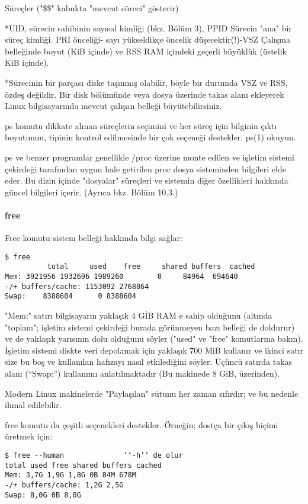 \begin{section}{Süreçler}
("\$\$" kabukta "mevcut süreci" gösterir)

*UID, sürecin sahibinin sayısal kimliği (bkz. Bölüm 3), PPID Sürecin "ana" bir süreç kimliği. PRI önceliği- sayı yükseldikçe öncelik düşecektir(!)-VSZ Çalışma 
belleğinde boyut (KiB içinde) ve RSS RAM içindeki geçerli büyüklük (üstelik KiB içinde).

*Sürecinin bir parçası diske taşınmış olabilir, böyle bir durumda VSZ ve RSS, özdeş değildir. Bir disk bölümünde veya dosya üzerinde takas alanı ekleyerek 
Linux bilgisayarında mevcut çalışan belleği büyütebilirsiniz. 

ps komutu dikkate alınan süreçlerin seçimini ve her süreç için bilginin çıktı boyutunun, tipinin kontrol edilmesinde bir çok seçeneği destekler. ps(1) okuyun.

ps ve benzer programlar genellikle /proc üzerine monte edilen ve işletim sistemi çekirdeği tarafından uygun hale getirilen proc dosya sisteminden bilgileri elde eder. Bu dizin içinde "dosyalar" süreçleri ve sistemin diğer özellikleri hakkında güncel bilgileri içerir. (Ayrıca bkz. Bölüm 10.3.)
\paragraph{free}{Free komutu sistem belleği hakkında bilgi sağlar:
\begin{verbatim}
$ free
          total     used    free     shared buffers  cached
Mem: 3921956 1932696 1989260        0     84964  694640 
-/+ buffers/cache: 1153092 2768864
Swap:    8388604      0 8388604
\end{verbatim}
}

"Mem:" satırı bilgisayarın yaklaşık 4 GİB RAM e sahip olduğunu (altında "toplam"; işletim sistemi çekirdeği burada görünmeyen bazı belleği de doldurur) ve de yaklaşık yarısının dolu olduğunu söyler ("used" ve "free" komutlarına bakın). İşletim sistemi diskte veri depolamak için yaklaşık 700 MiB kullanır ve ikinci satır size bu boş ve kullanılan hafızayı nasıl etkilediğini söyler. Üçüncü satırda takas alanı (“Swap:”) kullanımı anlatılmaktadır (Bu makinede 8 GiB, üzerinden).

Modern Linux makinelerde "Paylaşılan" sütunu her zaman sıfırdır; ve bu nedenle ihmal edilebilir.

free komutu da çeşitli seçenekleri destekler. Örneğin; dostça bir çıkış biçimi üretmek için:
\begin{verbatim}
$ free --human 				‘‘-h’’ de olur
total used free shared buffers cached
Mem: 3,7G 1,9G 1,8G 0B 84M 678M
-/+ buffers/cache: 1,2G 2,5G
Swap: 8,0G 0B 8,0G
\end{verbatim}


\end{section}
